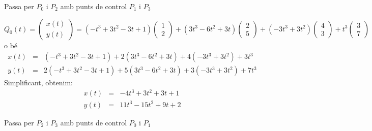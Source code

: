 \begin{llista}
\begin{llista}
  \blacksquare

  \item Passa per $P_0$ i $P_2$ amb punts de control $P_1$ i $P_3$


      \[
        Q_0(t)=\begin{pmatrix}x(t)\\y(t)\end{pmatrix}=(-t^3+3t^2-3t+1)\begin{pmatrix}1\\2\end{pmatrix}
              +(3t^3-6t^2+3t)\begin{pmatrix}2\\5\end{pmatrix}
              +(-3t^3+3t^2)\begin{pmatrix}4\\3\end{pmatrix}
              +t^3\begin{pmatrix}3\\7\end{pmatrix}
      \]
      o bé
      \begin{eqnarray*}
        x(t)&=&(-t^3+3t^2-3t+1)+2(3t^3-6t^2+3t)+4(-3t^3+3t^2)+3t^3\\
        y(t)&=&2(-t^3+3t^2-3t+1)+5(3t^3-6t^2+3t)+3(-3t^3+3t^2)+7t^3
      \end{eqnarray*}
      Simplificant, obtenim:
      \begin{eqnarray*}
        x(t)&=&-4t^3+3t^2+3t+1\\
        y(t)&=&11t^3-15t^2+9t+2
      \end{eqnarray*}
      \blacksquare

  \item Passa per $P_2$ i $P_3$ amb punts de control $P_0$ i $P_1$


\end{llista}
\end{llista}
